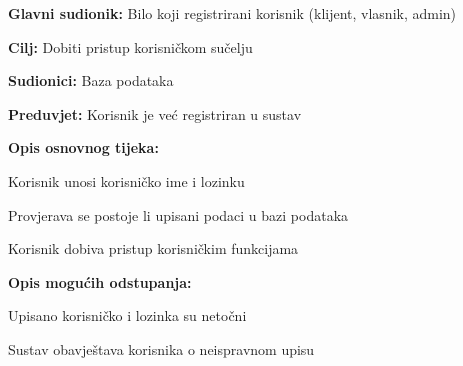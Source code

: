     				\noindent {}
    			\begin{packed_item}
    				
    				\item \textbf{Glavni sudionik:} Bilo koji registrirani korisnik (klijent, vlasnik, admin)
    				\item  \textbf{Cilj:} Dobiti pristup korisničkom sučelju  
    				\item  \textbf{Sudionici:} Baza podataka
    				\item  \textbf{Preduvjet:} Korisnik je već registriran u sustav
    				\item  \textbf{Opis osnovnog tijeka:}
    				
    				\item[] \begin{packed_enum}
    					
    					\item Korisnik unosi korisničko ime i lozinku
    					\item Provjerava se postoje li upisani podaci u bazi podataka
    					\item Korisnik dobiva pristup korisničkim funkcijama
    				\end{packed_enum}
    				
    				\item  \textbf{Opis mogućih odstupanja:}
    				
    				\item[] \begin{packed_item}
    					
    					\item[2.a] Upisano korisničko i lozinka su netočni
    					\item[] \begin{packed_enum}
    						
    						\item Sustav obavještava korisnika o neispravnom upisu
						\end{packed_enum}
    					
    				\end{packed_item}
    			\end{packed_item}
    				\noindent {}
